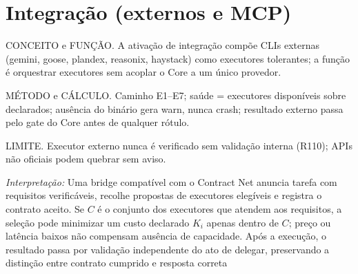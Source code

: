 \section{Integração (externos e MCP)}
\begin{descricao}
CONCEITO e FUNÇÃO. A ativação de integração compõe CLIs externas (gemini,
goose, plandex, reasonix, haystack) como executores tolerantes; a função é
orquestrar executores sem acoplar o Core a um único provedor.
\end{descricao}
\begin{metodo}
MÉTODO e CÁLCULO. Caminho E1--E7; saúde = executores disponíveis sobre
declarados; ausência do binário gera warn, nunca crash; resultado externo passa
pelo gate do Core antes de qualquer rótulo.
\end{metodo}
\begin{aviso}
LIMITE. Executor externo nunca é verificado sem validação interna (R110);
APIs não oficiais podem quebrar sem aviso.
\end{aviso}
\noindent\textit{Interpretação:} Uma bridge compatível com o Contract Net anuncia tarefa com requisitos verificáveis, recolhe propostas de executores elegíveis e registra o contrato aceito. Se $C$ é o conjunto dos executores que atendem aos requisitos, a seleção pode minimizar um custo declarado $K_i$ apenas dentro de $C$; preço ou latência baixos não compensam ausência de capacidade. Após a execução, o resultado passa por validação independente do ato de delegar, preservando a distinção entre contrato cumprido e resposta correta  %
